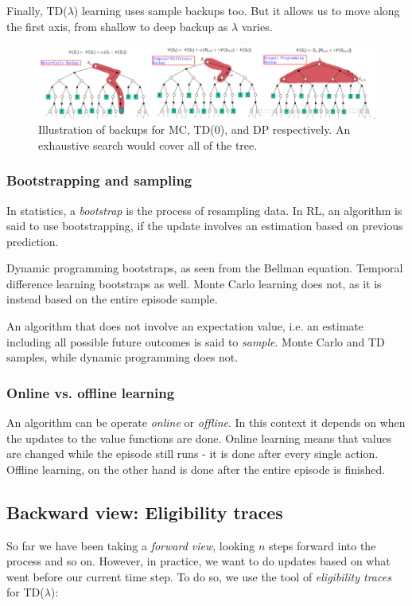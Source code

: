 \documentclass[12pt, a4paper]{article}
\numberwithin{equation}{section}
\begin{document}
Finally, TD($\lambda$) learning uses sample backups too. But it allows us to move along the first axis, from shallow to deep backup as $\lambda$ varies.

\begin{figure}
\centering
\includegraphics[width=\textwidth]{backups}
\caption{Illustration of backups for MC, TD(0), and DP respectively. An exhaustive search would cover all of the tree.}
\label{fig:backups}
\end{figure}

\subsubsection{Bootstrapping and sampling}
In statistics, a \textit{bootstrap} is the process of resampling data. In RL, an algorithm is said to use bootstrapping, if the update involves an estimation based on previous prediction.

Dynamic programming bootstraps, as seen from the Bellman equation. Temporal difference learning bootstraps as well. Monte Carlo learning does not, as it is instead based on the entire episode sample.

An algorithm that does not involve an expectation value, i.e. an estimate including all possible future outcomes is said to \textit{sample}. Monte Carlo and TD samples, while dynamic programming does not.

\subsubsection{Online vs. offline learning}
An algorithm can be operate \textit{online} or \textit{offline}. In this context it depends on when the updates to the value functions are done. Online learning means that values are changed while the episode still runs - it is done after every single action. Offline learning, on the other hand is done after the entire episode is finished.

\subsection{Backward view: Eligibility traces}
So far we have been taking a \textit{forward view}, looking $n$ steps forward into the process and so on. However, in practice, we want to do updates based on what went before our current time step. To do so, we use the tool of \textit{eligibility traces} for TD($\lambda$):
\end{document}
